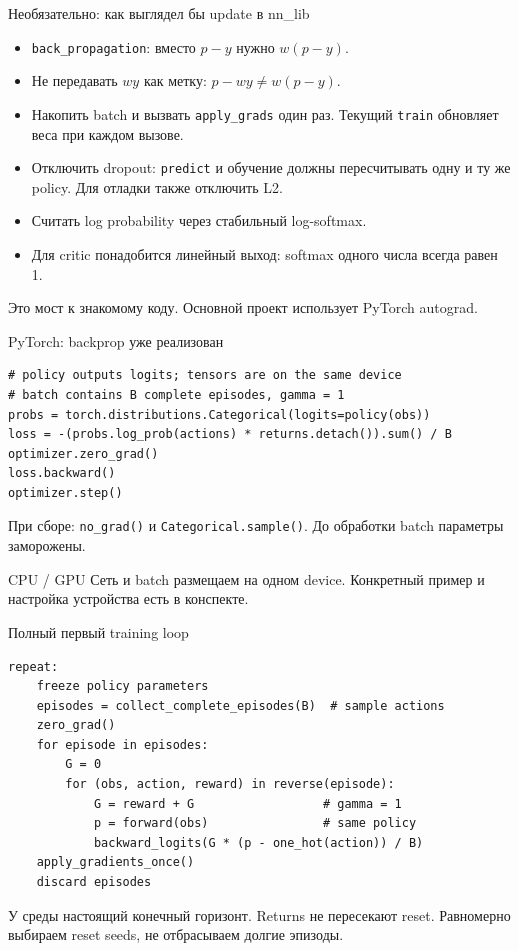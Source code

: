 \documentclass[aspectratio=169]{beamer}
\begin{document}
\begin{frame}{Необязательно: как выглядел бы update в nn\_lib}
  \small
  \begin{itemize}
    \item \texttt{back\_propagation}: вместо $p-y$ нужно $w(p-y)$.
    \item Не передавать $wy$ как метку: $p-wy\ne w(p-y)$.
    \item Накопить batch и вызвать \texttt{apply\_grads} один раз.
      Текущий \texttt{train} обновляет веса при каждом вызове.
    \item Отключить dropout: \texttt{predict} и обучение должны
      пересчитывать одну и ту же policy. Для отладки также отключить L2.
    \item Считать log probability через стабильный log-softmax.
    \item Для critic понадобится линейный выход: softmax одного числа
      всегда равен 1.
  \end{itemize}
  Это мост к знакомому коду. Основной проект использует PyTorch autograd.
\end{frame}

\begin{frame}[fragile]{PyTorch: backprop уже реализован}
  \small
\begin{verbatim}
# policy outputs logits; tensors are on the same device
# batch contains B complete episodes, gamma = 1
probs = torch.distributions.Categorical(logits=policy(obs))
loss = -(probs.log_prob(actions) * returns.detach()).sum() / B
optimizer.zero_grad()
loss.backward()
optimizer.step()
\end{verbatim}
  При сборе: \texttt{no\_grad()} и \texttt{Categorical.sample()}.
  До обработки batch параметры заморожены.
  \begin{block}{CPU / GPU}
    Сеть и batch размещаем на одном device.
    Конкретный пример и настройка устройства есть в конспекте.
  \end{block}
\end{frame}

\begin{frame}[fragile]{Полный первый training loop}
  \small
\begin{verbatim}
repeat:
    freeze policy parameters
    episodes = collect_complete_episodes(B)  # sample actions
    zero_grad()
    for episode in episodes:
        G = 0
        for (obs, action, reward) in reverse(episode):
            G = reward + G                  # gamma = 1
            p = forward(obs)                # same policy
            backward_logits(G * (p - one_hot(action)) / B)
    apply_gradients_once()
    discard episodes
\end{verbatim}
  У среды настоящий конечный горизонт. Returns не пересекают reset.
  Равномерно выбираем reset seeds, не отбрасываем долгие эпизоды.
\end{frame}
\end{document}
